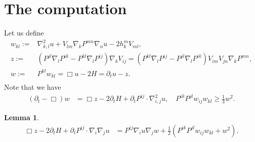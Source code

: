 \documentclass{amsart}
\newtheorem{lemma}[theorem]{Lemma}
\theoremstyle{definition}
\theoremstyle{remark}
\numberwithin{equation}{section}
\begin{document}
\section{The computation}
Let us define
\begin{align*}
w_{kl}:=&\nabla^2_{k,l}u+V_{lm}\nabla_kP^{mn}\nabla_nu-2h_k^mV_{ml},\\
z:=&\left(P^{jl}\nabla_lP^{ik}-P^{kl}\nabla_l P^{ij}\right)\nabla_kV_{ij}=\left(P^{kl}\nabla_l P^{ij}-P^{jl}\nabla_lP^{ik}\right)V_{im}V_{jn}\nabla_kP^{mn},\\
w:=&P^{kl}w_{kl}=\Box u-2H=\partial_tu-z.\\
\end{align*}
Note that we have
\begin{align}
(\partial_t-\Box)w
&=\Box z-2\partial_tH+\partial_tP^{ij}\cdot\nabla^2_{i,j}u,\quad P^{ik}P^{jl}w_{ij}w_{kl}\geq \frac{1}{3}w^2.
\end{align}
\begin{lemma}
\begin{align*}
\Box z-2\partial_tH+\partial_tP^{ij}\cdot\nabla_i\nabla_ju&=P^{ij}\nabla_i u\nabla_j w+ \frac{1}{2}\left(P^{ik}P^{jl}w_{ij}w_{kl}+w^2\right).\\
\end{align*}
\end{lemma}
\end{document}
